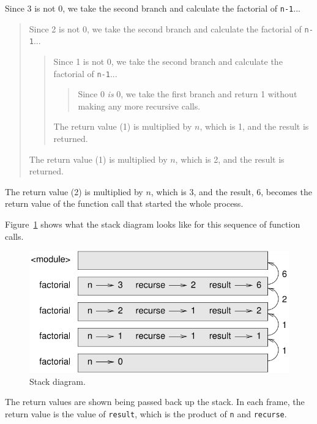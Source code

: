 \documentclass[10pt]{book}
\begin{document}
\begin{CJK}{UTF8}{gbsn}
Since 3 is not 0, we take the second branch and calculate the factorial
of {\tt n-1}...

\begin{quote}
Since 2 is not 0, we take the second branch and calculate the factorial of
{\tt n-1}...


  \begin{quote}
  Since 1 is not 0, we take the second branch and calculate the factorial
  of {\tt n-1}...


    \begin{quote}
    Since 0 {\em is} 0, we take the first branch and return 1
    without making any more recursive calls.
    \end{quote}


  The return value (1) is multiplied by $n$, which is 1, and the
  result is returned.
  \end{quote}


The return value (1) is multiplied by $n$, which is 2, and the
result is returned.
\end{quote}


The return value (2) is multiplied by $n$, which is 3, and the result, 6,
becomes the return value of the function call that started the whole
process.

Figure~\ref{fig.stack3} shows what the stack diagram looks like for
this sequence of function calls.

\begin{figure}
\centerline
{\includegraphics[scale=0.8]{figs/stack3.pdf}}
\caption{Stack diagram.}
\label{fig.stack3}
\end{figure}

The return values are shown being passed back up the stack.  In each
frame, the return value is the value of {\tt result}, which is the
product of {\tt n} and {\tt recurse}.


\end{CJK}
\end{document}
